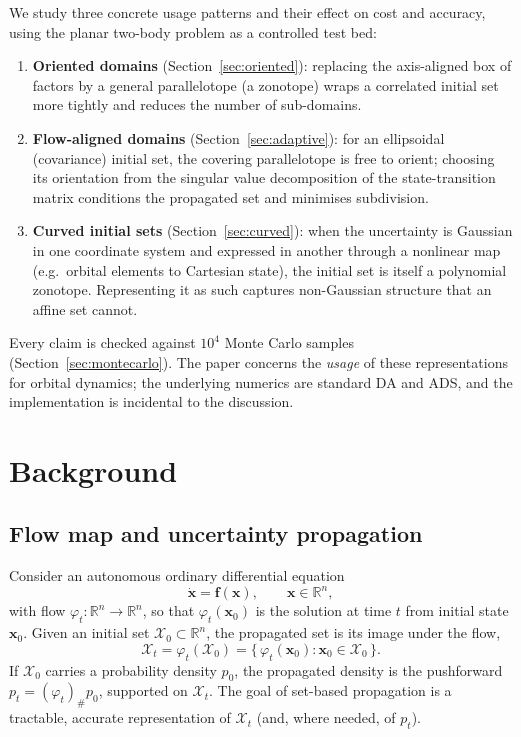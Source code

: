 \documentclass[11pt]{article}
\newcommand{\R}{\mathbb{R}}
\newcommand{\bx}{\bm{x}}
\newcommand{\bff}{\bm{f}}
\begin{document}
We study three concrete usage patterns and their effect on cost and accuracy,
using the planar two-body problem as a controlled test bed:
\begin{enumerate}
  \item \textbf{Oriented domains} (Section~\ref{sec:oriented}): replacing the
        axis-aligned box of factors by a general parallelotope (a zonotope)
        wraps a correlated initial set more tightly and reduces the number of
        sub-domains.
  \item \textbf{Flow-aligned domains} (Section~\ref{sec:adaptive}): for an
        ellipsoidal (covariance) initial set, the covering parallelotope is free
        to orient; choosing its orientation from the singular value
        decomposition of the state-transition matrix conditions the propagated
        set and minimises subdivision.
  \item \textbf{Curved initial sets} (Section~\ref{sec:curved}): when the
        uncertainty is Gaussian in one coordinate system and expressed in
        another through a nonlinear map (e.g.\ orbital elements to Cartesian
        state), the initial set is itself a polynomial zonotope. Representing it
        as such captures non-Gaussian structure that an affine set cannot.
\end{enumerate}
Every claim is checked against $10^4$ Monte Carlo samples
(Section~\ref{sec:montecarlo}). The paper concerns the \emph{usage} of these
representations for orbital dynamics; the underlying numerics are standard DA and
ADS, and the implementation is incidental to the discussion.

\section{Background}
\label{sec:background}

\subsection{Flow map and uncertainty propagation}

Consider an autonomous ordinary differential equation
\begin{equation}
  \dot{\bx} = \bff(\bx), \qquad \bx \in \R^n,
  \label{eq:ode}
\end{equation}
with flow $\varphi_t : \R^n \to \R^n$, so that $\varphi_t(\bx_0)$ is the solution
at time $t$ from initial state $\bx_0$. Given an initial set
$\mathcal{X}_0 \subset \R^n$, the propagated set is its image under the flow,
\begin{equation}
  \mathcal{X}_t = \varphi_t(\mathcal{X}_0)
  = \{\, \varphi_t(\bx_0) : \bx_0 \in \mathcal{X}_0 \,\}.
  \label{eq:propagated}
\end{equation}
If $\mathcal{X}_0$ carries a probability density $p_0$, the propagated density is
the pushforward $p_t = (\varphi_t)_\# p_0$, supported on $\mathcal{X}_t$. The
goal of set-based propagation is a tractable, accurate representation of
$\mathcal{X}_t$ (and, where needed, of $p_t$).
\end{document}
